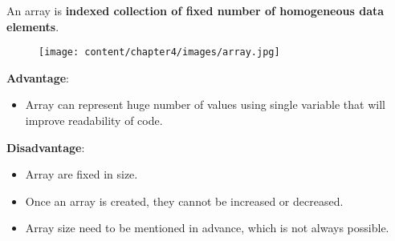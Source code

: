 \setlength{\columnsep}{3pt}
\begin{flushleft}
	\bigskip
	An array is \textbf{indexed collection of fixed number of homogeneous data elements}.
	
	\bigskip\bigskip
	\begin{figure}[h!]
		\centering
		\texttt{[image: content/chapter4/images/array.jpg]}
	\end{figure}		
	
	\textbf{Advantage}:
	\begin{itemize}
		\item Array can represent huge number of values using single variable that will improve readability of code.
	\end{itemize}
	
	\textbf{Disadvantage}:
	\begin{itemize}
		\item Array are fixed in size.
		\item Once an array is created, they cannot be increased or decreased.
		\item Array size need to be mentioned in advance, which is not always possible.
	\end{itemize}
	
	
\end{flushleft}




